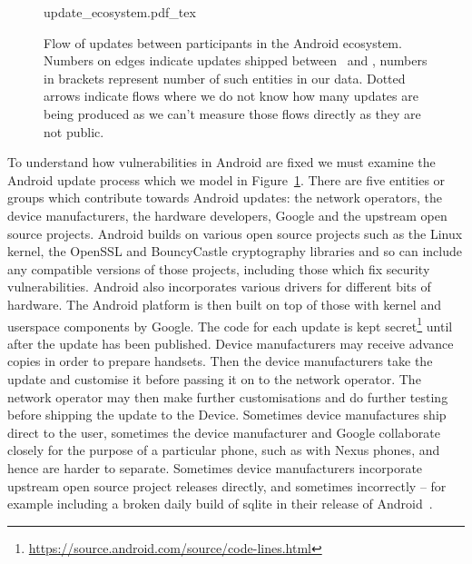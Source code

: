 \documentclass[conference,a4paper,twoside]{IEEEtran}
\let\OldTodo\todo
\renewcommand{\todo}{\OldTodo[inline]}
\newcommand{\todolater}[1]{}%
\begin{document}
\label{sec:android_update_process}
\begin{figure}
 \centering
 \def\svgwidth{\columnwidth}
 {update_ecosystem.pdf_tex}
 \caption{Flow of updates between participants in the Android ecosystem.
 Numbers on edges indicate updates shipped between \daStartDate\ and \daEndDate, numbers in brackets represent number of such entities in our data.
 Dotted arrows indicate flows where we do not know how many updates are being produced as we can't measure those flows directly as they are not public.\todolater{Turn into a sankey diagram}}
 \label{fig:update_ecosystem}
\end{figure}
To understand how vulnerabilities in Android are fixed we must examine the Android update process which we model in Figure~\ref{fig:update_ecosystem}.
There are five entities or groups which contribute towards Android updates: the network operators, the device manufacturers, the hardware developers, Google and the upstream open source projects.
Android builds on various open source projects such as the Linux kernel, the OpenSSL and BouncyCastle cryptography libraries and so can include any compatible versions of those projects, including those which fix security vulnerabilities.
Android also incorporates various drivers for different bits of hardware.
The Android platform is then built on top of those with kernel and userspace components by Google.
The code for each update is kept secret\footnote{\url{https://source.android.com/source/code-lines.html}}\todolater{Can we quantify this keeping the code secret? Is it worth it?} until after the update has been published.
Device manufacturers may receive advance copies in order to prepare handsets.
Then the device manufacturers take the update and customise it before passing it on to the network operator.
The network operator may then make further customisations and do further testing before shipping the update to the Device.
Sometimes device manufactures ship direct to the user, sometimes the device manufacturer and Google collaborate closely for the purpose of a particular phone, such as with Nexus phones, and hence are harder to separate.
Sometimes device manufacturers incorporate upstream open source project releases directly, and sometimes incorrectly -- for example including a broken daily build of sqlite in their release of Android~\cite{Wagner2013}.
\todolater{use statistics from samsung-updates.com -> how many binaries are there per device?}
\end{document}
